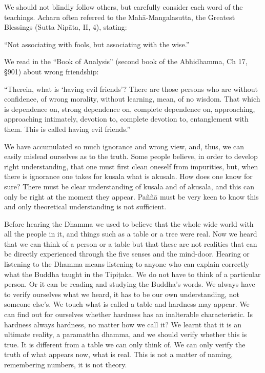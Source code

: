 {{{{{{{We should not blindly follow others,
but carefully consider each word of the teachings. Acharn often referred
to the Mahā-Mangalasutta, the Greatest Blessings (Sutta Nipāta, II, 4),
stating: 

``Not associating with fools, but
associating with the wise.'' 

We read in the ``Book of Analysis''
(second book of the Abhidhamma, Ch 17, §901) about wrong friendship:

``Therein, what is `having evil
friends'? There are those persons who are without confidence, of wrong
morality, without learning, mean, of no wisdom. That which is dependence
on, strong dependence on, complete dependence on, approaching,
approaching intimately, devotion to, complete devotion to, entanglement
with them. This is called having evil friends.'' 

We have accumulated so much ignorance
and wrong view, and, thus, we can easily mislead ourselves as to the
truth. Some people believe, in order to develop right understanding,
that one must first clean oneself from impurities, but, when there is
ignorance one takes for kusala what is akusala. How does one know for
sure? There must be clear understanding of kusala and of akusala, and
this can only be right at the moment they appear. Paññā must be very
keen to know this and only theoretical understanding is not sufficient.
~

Before hearing the Dhamma we used to
believe that the whole wide world with all the people in it, and things
such as a table or a tree were real. Now we heard that we can think of a
person or a table but that these are not realities that can be directly
experienced through the five senses and the mind-door. Hearing or
listening to the Dhamma means listening to anyone who can explain
correctly what the Buddha taught in the Tipiṭaka. We do not have to
think of a particular person. Or it can be reading and studying the
Buddha's words. We always have to verify ourselves what we heard, it has
to be our own understanding, not someone else's. We touch what is called
a table and hardness may appear. We can find out for ourselves whether
hardness has an inalterable characteristic. Is hardness always hardness,
no matter how we call it? We learnt that it is an ultimate reality, a
paramattha dhamma, and we should verify whether this is true. It is
different from a table we can only think of. We can only verify the
truth of what appears now, what is real. This is not a matter of naming,
remembering numbers, it is not theory.

}}}}}}}
